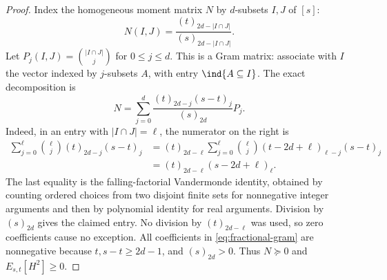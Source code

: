 \begin{proof}
Index the homogeneous moment matrix $N$ by $d$-subsets $I,J$ of $[s]$:
\[
 N(I,J)=\frac{(t)_{2d-|I\cap J|}}{(s)_{2d-|I\cap J|}}.
\]
Let $P_j(I,J)=\binom{|I\cap J|}{j}$ for $0\le j\le d$.
This is a Gram matrix: associate with $I$ the vector indexed by
$j$-subsets $A$, with entry $\ind\{A\subseteq I\}$.
The exact decomposition is
\begin{equation}\label{eq:fractional-gram}
 N=\sum_{j=0}^d
   \frac{(t)_{2d-j}(s-t)_j}{(s)_{2d}}P_j.
\end{equation}
Indeed, in an entry with $|I\cap J|=\ell$, the numerator on the right
is
\begin{align*}
 \sum_{j=0}^\ell\binom\ell j(t)_{2d-j}(s-t)_j
 &=(t)_{2d-\ell}
   \sum_{j=0}^\ell\binom\ell j
       (t-2d+\ell)_{\ell-j}(s-t)_j\\
 &=(t)_{2d-\ell}(s-2d+\ell)_\ell.
\end{align*}
The last equality is the falling-factorial Vandermonde identity, obtained
by counting ordered choices from two disjoint finite sets for nonnegative
integer arguments and then by polynomial identity for real arguments.
Division by $(s)_{2d}$ gives the claimed entry. No division by
$(t)_{2d-\ell}$ was used, so zero coefficients cause no exception.
All coefficients in \eqref{eq:fractional-gram} are nonnegative because
$t,s-t\ge2d-1$, and $(s)_{2d}>0$. Thus $N\succeq0$ and
$E_{s,t}[H^2]\ge0$.
\end{proof}

